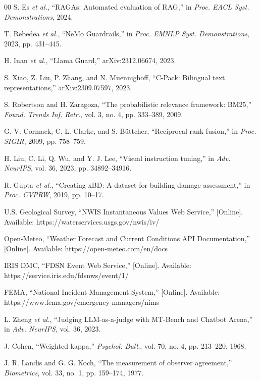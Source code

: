 \documentclass[conference]{IEEEtran}
\begin{document}
\begin{thebibliography}{00}
 S. Es \textit{et al.}, ``RAGAs: Automated evaluation of RAG,'' in \textit{Proc. EACL Syst. Demonstrations}, 2024.

 T. Rebedea \textit{et al.}, ``NeMo Guardrails,'' in \textit{Proc. EMNLP Syst. Demonstrations}, 2023, pp. 431--445.

 H. Inan \textit{et al.}, ``Llama Guard,'' arXiv:2312.06674, 2023.

 S. Xiao, Z. Liu, P. Zhang, and N. Muennighoff, ``C-Pack: Bilingual text representations,'' arXiv:2309.07597, 2023.

 S. Robertson and H. Zaragoza, ``The probabilistic relevance framework: BM25,'' \textit{Found. Trends Inf. Retr.}, vol. 3, no. 4, pp. 333--389, 2009.

 G. V. Cormack, C. L. Clarke, and S. B\"{u}ttcher, ``Reciprocal rank fusion,'' in \textit{Proc. SIGIR}, 2009, pp. 758--759.

 H. Liu, C. Li, Q. Wu, and Y. J. Lee, ``Visual instruction tuning,'' in \textit{Adv. NeurIPS}, vol. 36, 2023, pp. 34892--34916.

 R. Gupta \textit{et al.}, ``Creating xBD: A dataset for building damage assessment,'' in \textit{Proc. CVPRW}, 2019, pp. 10--17.

 U.S. Geological Survey, ``NWIS Instantaneous Values Web Service,'' [Online]. Available: https://waterservices.usgs.gov/nwis/iv/



 Open-Meteo, ``Weather Forecast and Current Conditions API Documentation,'' [Online]. Available: https://open-meteo.com/en/docs



 IRIS DMC, ``FDSN Event Web Service,'' [Online]. Available: https://service.iris.edu/fdsnws/event/1/



 FEMA, ``National Incident Management System,'' [Online]. Available: https://www.fema.gov/emergency-managers/nims



 L. Zheng \textit{et al.}, ``Judging LLM-as-a-judge with MT-Bench and Chatbot Arena,'' in \textit{Adv. NeurIPS}, vol. 36, 2023.



 J. Cohen, ``Weighted kappa,'' \textit{Psychol. Bull.}, vol. 70, no. 4, pp. 213--220, 1968.



 J. R. Landis and G. G. Koch, ``The measurement of observer agreement,'' \textit{Biometrics}, vol. 33, no. 1, pp. 159--174, 1977.\end{thebibliography}
\end{document}
